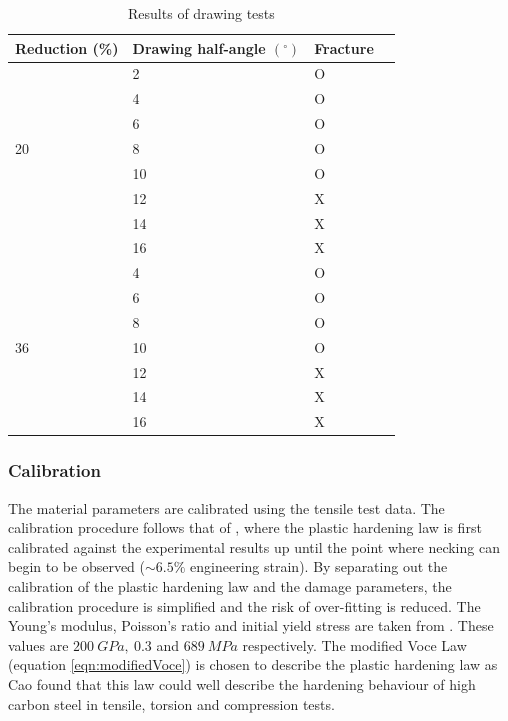 \documentclass[sn-mathphys,Numbered,draft]{sn-jnl}%
\begin{document}
\begin{table}[htb]
	\centering
		\begin{tabular}{llll} \hline
			Reduction (\%) & Drawing half-angle $(^{\circ})$ & Fracture  \\ \hline 
             & 2 & O \\
			 & 4 & O \\
   		 & 6 & O \\
      	20 & 8 & O \\
             & 10 & O \\
             & 12 & X \\
             & 14 & X \\
             & 16 & X \\
			\hline
			 & 4 & O \\
   		 & 6 & O \\
      	 & 8 & O \\
           36  & 10 & O \\
             & 12 & X \\
             & 14 & X \\
             & 16 & X \\
			\hline
		\end{tabular}
	\caption{Results of drawing tests \cite{roh_process_2021}}
	\label{tab:material_properties}
\end{table}

\subsubsection{Calibration}

The material parameters are calibrated using the tensile test data. The calibration procedure follows that of \citet{masse_study_2010}, where the plastic hardening law is first calibrated against the experimental results up until the point where necking can begin to be observed ($\sim6.5\%$ engineering strain). By separating out the calibration of the plastic hardening law and the damage parameters, the calibration procedure is simplified and the risk of over-fitting is reduced. The Young's modulus, Poisson's ratio and initial yield stress are taken from \citet{roh_process_2021}. These values are $200\ GPa,\ 0.3$ and $689\ MPa$ respectively. The modified Voce Law 
(equation \ref{eqn:modifiedVoce}) \cite{cao_modelling_2014} is chosen to describe the plastic hardening law as Cao \cite{cao_modelling_2014} found that this law could well describe the hardening behaviour of high carbon steel in tensile, torsion and compression tests. 
\end{document}
